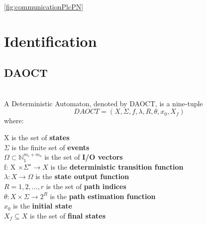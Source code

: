 \autoref{fig:communicationPlcPN}

\section{Identification}
\label{sec:identification}


\subsection{DAOCT}

\begin{definition}
\label{def:daoct}~\\  
A Deterministic Automaton, denoted by DAOCT, is a nine-tuple
\[ DAOCT = (X,\Sigma,f,\lambda,R,\theta, x_0,X_f)\]
where:

\indent X is the set of \textbf{states} \\
\indent $\Sigma$ is the finite set of \textbf{events}\\
\indent $\Omega \subset \mathbb{N}_1^{m_i+m_o} $ is the set of \textbf{I/O vectors}\\
\indent f: X $\times \Sigma^\star \rightarrow X$ is the \textbf{deterministic transition function}  \\ 
\indent $\lambda : X \rightarrow \Omega$ is the \textbf{state output function} \\
\indent $R = {1,2,\dots,r}$ is the set of \textbf{path indices} \\
\indent $\theta : X \times \Sigma \rightarrow 2^R$ is the \textbf{path
  estimation function} \\
\indent $x_0$ is the \textbf{initial state} \\
\indent $X_f \subseteq X $ is the set of \textbf{final states}
\end{definition}

